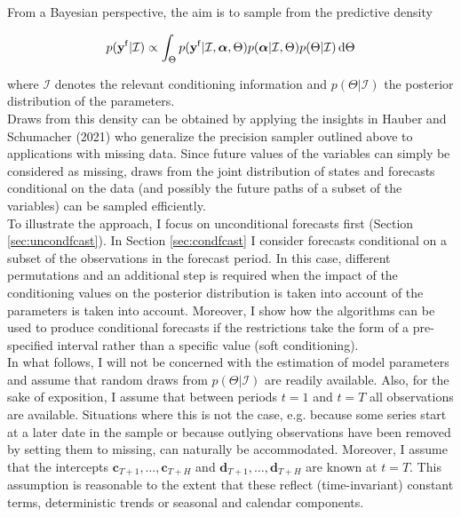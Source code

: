 \documentclass[notitlepage,a4paper,12pt]{article}
\begin{document}
From a Bayesian perspective, the aim is to sample from the predictive density 

$$
p(\mathbf{y^{\sf{f}}}|\mathcal{I}) \propto \int_{\Theta} p(\mathbf{y^{\sf{f}}}|\mathcal{I}, \boldsymbol{\alpha},\Theta) p(\boldsymbol{\alpha}|\mathcal{I}, \Theta) p(\Theta|\mathcal{I})\, \text{d}\Theta
$$

where $\mathcal{I}$ denotes the relevant conditioning information and $p(\Theta|\mathcal{I})$ the posterior distribution of the parameters.\\

Draws from this density can be obtained by applying the insights in Hauber and Schumacher (2021) who generalize the precision sampler outlined above to applications with missing data. Since future values of the variables can simply be considered as missing, draws from the joint distribution of states and forecasts conditional on the data (and possibly the future paths of a subset of the variables) can be sampled efficiently.\\

To illustrate the approach, I focus on unconditional forecasts first (Section \ref{sec:uncondfcast}). In Section \ref{sec:condfcast} I consider forecasts conditional on a subset of the observations in the forecast period. In this case, different permutations and an additional step is required when the impact of the conditioning values on the posterior distribution is taken into account of the parameters is taken into account. Moreover, I show how the algorithms can be used to produce conditional forecasts if the restrictions take the form of a pre-specified interval rather than a specific value (soft conditioning).\\

In what follows, I will not be concerned with the estimation of model parameters and assume that random draws from $p(\Theta|\mathcal{I})$ are readily available. Also, for the sake of exposition, I assume that between periods $t=1$ and $t=T$ all observations are available. Situations where this is not the case, e.g. because some series start at a later date in the sample or because outlying observations have been removed by setting them to missing, can naturally be accommodated. Moreover, I assume that the intercepts $\mathbf{c}_{T+1}, \dots, \mathbf{c}_{T+H}$ and $\mathbf{d}_{T+1}, \dots, \mathbf{d}_{T+H}$ are known at $t=T$. This assumption is reasonable to the extent that these reflect (time-invariant) constant terms, deterministic trends or seasonal and calendar components. 
\end{document}
